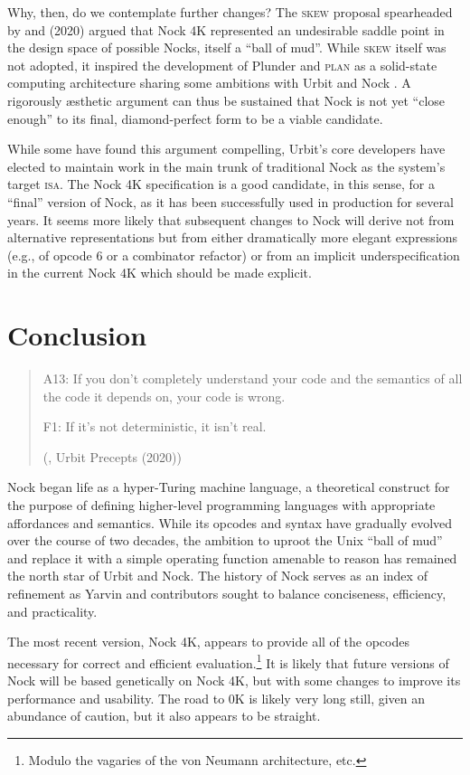 \documentclass[twoside]{article}
\begin{document}
Why, then, do we contemplate further changes?  The \textsc{skew} proposal spearheaded by  and  (2020) argued that Nock 4K represented an undesirable saddle point in the design space of possible Nocks, itself a ``ball of mud''.  While \textsc{skew} itself was not adopted, it inspired the development of Plunder and \textsc{plan} as a solid-state computing architecture sharing some ambitions with Urbit and Nock \citep{Plunder2025}.  A rigorously æsthetic argument can thus be sustained that Nock is not yet ``close enough'' to its final, diamond-perfect form to be a viable candidate.

While some have found this argument compelling, Urbit's core developers have elected to maintain work in the main trunk of traditional Nock as the system's target \textsc{isa}.  The Nock 4K specification is a good candidate, in this sense, for a ``final'' version of Nock, as it has been successfully used in production for several years.  It seems more likely that subsequent changes to Nock will derive not from alternative representations but from either dramatically more elegant expressions (e.g., of \mbox{opcode} 6 or a combinator refactor) or from an \mbox{implicit} under\-specification in the current Nock 4K which should be made \mbox{explicit}.

\section{Conclusion}

\begin{quote}
A13:  If you don't completely understand your code and the semantics of all the code it depends on, your code is wrong.

F1: If it's not deterministic, it isn't real.

(, Urbit Precepts (2020))
\end{quote}

Nock began life as a hyper-Turing machine language, a theoretical construct for the purpose of defining higher-level programming languages with appropriate affordances and semantics.  While its opcodes and syntax have gradually evolved over the course of two decades, the ambition to uproot the Unix ``ball of mud'' and replace it with a simple operating function amenable to reason has remained the north star of Urbit and Nock.  The history of Nock serves as an index of refinement as Yarvin and contributors sought to balance conciseness, efficiency, and practicality.

The most recent version, Nock 4K, appears to provide all of the opcodes necessary for correct and efficient evaluation.\footnote{Modulo the vagaries of the von Neumann architecture, etc.}  It is likely that future versions of Nock will be based genetically on Nock 4K, but with some changes to improve its performance and usability.  The road to 0K is likely very long still, given an abundance of caution, but it also appears to be straight.

\nocite{Nock13K, Nock12K, Nock11K, Nock10K, Nock9K, Nock8K, Nock7K, Nock6K, Nock5K, Nock4K}
\printbibliography
\end{document}
